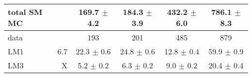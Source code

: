 \begin{table}[htb]
\begin{center}
\begin{tabular}{lr|cccc}
\hline
    total SM MC   &        & 169.7 $\pm$ 4.2   &184.3 $\pm$ 3.9   &432.2 $\pm$ 6.0   &786.1 $\pm$ 8.3  \\
\hline
           data   &        &             193   &            201   &            485   &            879  \\
\hline
            LM1   &    6.7 &  22.3 $\pm$ 0.6   & 24.8 $\pm$ 0.6   & 12.8 $\pm$ 0.4   & 59.9 $\pm$ 0.9  \\
            LM3   &      X &   5.2 $\pm$ 0.2   &  6.3 $\pm$ 0.2   &  9.0 $\pm$ 0.2   & 20.4 $\pm$ 0.4  \\
\hline
\end{tabular}
\end{center}
\end{table}

